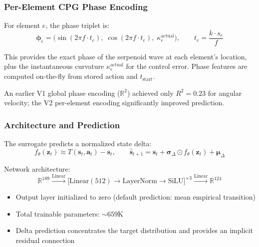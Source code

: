 \documentclass[11pt]{article}
\begin{document}
\subsubsection{Per-Element CPG Phase Encoding}
\label{sec:surrogate:model:phase}

For element $e$, the phase triplet is:
\begin{equation}
  \boldsymbol{\phi}_e
    = \bigl(\sin(2\pi f \cdot t_e),\;
            \cos(2\pi f \cdot t_e),\;
            \kappa_e^{\text{actual}}\bigr), \qquad
  t_e = \frac{k \cdot s_e}{f}
  \label{eq:per-element-phase}
\end{equation}

This provides the exact phase of the serpenoid wave at each element's location, plus the instantaneous curvature $\kappa_e^{\text{actual}}$ for the control error.
Phase features are computed on-the-fly from stored action and $t_{\text{start}}$.

An earlier V1 global phase encoding ($\mathbb{R}^2$) achieved only $R^2 = 0.23$ for angular velocity; the V2 per-element encoding significantly improved prediction.

\subsubsection{Architecture and Prediction}
\label{sec:surrogate:model:arch}

The surrogate predicts a normalized state delta:
\begin{equation}
  f_\theta(\mathbf{z}_t) \approx T(\mathbf{s}_t, \mathbf{a}_t) - \mathbf{s}_t, \qquad
  \hat{\mathbf{s}}_{t+1}
    = \mathbf{s}_t
      + \boldsymbol{\sigma}_\Delta \odot f_\theta(\mathbf{z}_t)
      + \boldsymbol{\mu}_\Delta
  \label{eq:next-state-reconstruction}
\end{equation}

Network architecture:
\begin{equation}
  \mathbb{R}^{189}
    \xrightarrow{\text{Linear}}
    \bigl[\text{Linear}(512) \to \text{LayerNorm} \to \text{SiLU}\bigr]^{\times 3}
    \xrightarrow{\text{Linear}}
    \mathbb{R}^{124}
  \label{eq:architecture}
\end{equation}

\begin{itemize}
  \item Output layer initialized to zero (default prediction: mean empirical transition)
  \item Total trainable parameters: ${\sim}659$K
  \item Delta prediction concentrates the target distribution and provides an implicit residual connection
\end{itemize}
\end{document}
